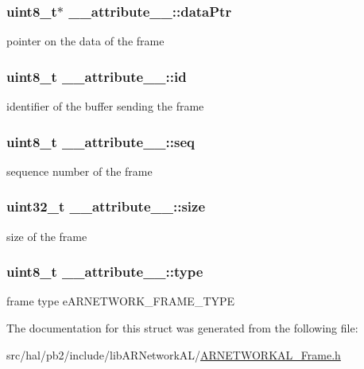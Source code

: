 \subsubsection[{\texorpdfstring{data\+Ptr}{dataPtr}}]{\setlength{\rightskip}{0pt plus 5cm}uint8\+\_\+t$\ast$ \+\_\+\+\_\+attribute\+\_\+\+\_\+\+::data\+Ptr}\hypertarget{struct____attribute_____ac9e8804fba22017607837af46597b5f1}{}\label{struct____attribute_____ac9e8804fba22017607837af46597b5f1}
pointer on the data of the frame 
\subsubsection[{\texorpdfstring{id}{id}}]{\setlength{\rightskip}{0pt plus 5cm}uint8\+\_\+t \+\_\+\+\_\+attribute\+\_\+\+\_\+\+::id}\hypertarget{struct____attribute_____a8ab2a4d1f9eb1727125fb5a68d3e4e71}{}\label{struct____attribute_____a8ab2a4d1f9eb1727125fb5a68d3e4e71}
identifier of the buffer sending the frame 
\subsubsection[{\texorpdfstring{seq}{seq}}]{\setlength{\rightskip}{0pt plus 5cm}uint8\+\_\+t \+\_\+\+\_\+attribute\+\_\+\+\_\+\+::seq}\hypertarget{struct____attribute_____a198b3d0e2c50f749c71e091b5297dcbd}{}\label{struct____attribute_____a198b3d0e2c50f749c71e091b5297dcbd}
sequence number of the frame 
\subsubsection[{\texorpdfstring{size}{size}}]{\setlength{\rightskip}{0pt plus 5cm}uint32\+\_\+t \+\_\+\+\_\+attribute\+\_\+\+\_\+\+::size}\hypertarget{struct____attribute_____a04032b2782f3c2f600024b42bf2478f4}{}\label{struct____attribute_____a04032b2782f3c2f600024b42bf2478f4}
size of the frame 
\subsubsection[{\texorpdfstring{type}{type}}]{\setlength{\rightskip}{0pt plus 5cm}uint8\+\_\+t \+\_\+\+\_\+attribute\+\_\+\+\_\+\+::type}\hypertarget{struct____attribute_____a30e60959661cf2e3b2dcc52e5d3e9249}{}\label{struct____attribute_____a30e60959661cf2e3b2dcc52e5d3e9249}
frame type e\+A\+R\+N\+E\+T\+W\+O\+R\+K\+\_\+\+F\+R\+A\+M\+E\+\_\+\+T\+Y\+PE 

The documentation for this struct was generated from the following file\+:\begin{DoxyCompactItemize}
\item 
src/hal/pb2/include/lib\+A\+R\+Network\+A\+L/\hyperlink{_a_r_n_e_t_w_o_r_k_a_l___frame_8h}{A\+R\+N\+E\+T\+W\+O\+R\+K\+A\+L\+\_\+\+Frame.\+h}\end{DoxyCompactItemize}
